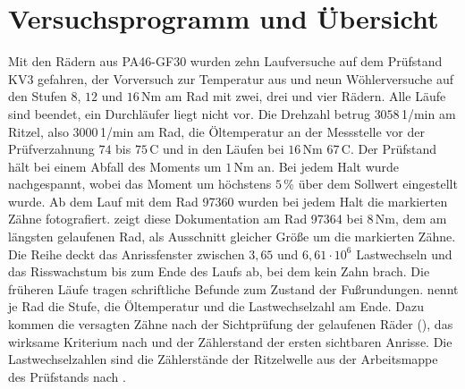 \section{Versuchsprogramm und Übersicht}
\label{sec:versuchsprogramm}

Mit den Rädern aus PA46-GF30 wurden zehn Laufversuche auf dem Prüfstand KV3 gefahren, der Vorversuch zur Temperatur aus  und neun Wöhlerversuche auf den Stufen $8$, $12$ und $16$\,Nm am Rad mit zwei, drei und vier Rädern. Alle Läufe sind beendet, ein Durchläufer liegt nicht vor. Die Drehzahl betrug $3058$\,1/min am Ritzel, also $3000$\,1/min am Rad, die Öltemperatur an der Messstelle vor der Prüfverzahnung $74$ bis $75$\,\textdegree C und in den Läufen bei $16$\,Nm $67$\,\textdegree C. Der Prüfstand hält bei einem Abfall des Moments um $1$\,Nm an. Bei jedem Halt wurde nachgespannt, wobei das Moment um höchstens $5$\,\% über dem Sollwert eingestellt wurde. Ab dem Lauf mit dem Rad 97360 wurden bei jedem Halt die markierten Zähne fotografiert.  zeigt diese Dokumentation am Rad 97364 bei $8$\,Nm, dem am längsten gelaufenen Rad, als Ausschnitt gleicher Größe um die markierten Zähne. Die Reihe deckt das Anrissfenster zwischen $3{,}65$ und $6{,}61 \cdot 10^{6}$ Lastwechseln und das Risswachstum bis zum Ende des Laufs ab, bei dem kein Zahn brach. Die früheren Läufe tragen schriftliche Befunde zum Zustand der Fußrundungen.  nennt je Rad die Stufe, die Öltemperatur und die Lastwechselzahl am Ende. Dazu kommen die versagten Zähne nach der Sichtprüfung der gelaufenen Räder (), das wirksame Kriterium nach  und der Zählerstand der ersten sichtbaren Anrisse. Die Lastwechselzahlen sind die Zählerstände der Ritzelwelle aus der Arbeitsmappe des Prüfstands nach .

